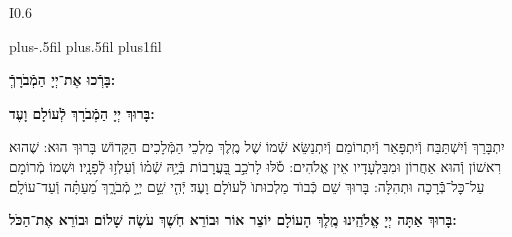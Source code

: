 \documentclass[twoside, openany, parskip=half, 11pt]{book}
\begin{document}
\newcommand{\barachu}{
\begin{wrapfigure}[5]{I}{0.6\textwidth}
\begin{minipage}{0.6\textwidth}
\leftskip=0pt plus-.5fil
\rightskip=0pt plus.5fil
\parfillskip=0pt plus1fil
\begin{large}

\shatz
\begin{Large}\textbf{בָּרְֿכוּ אֶת־יְיָ הַמְֿבֹרָךְֿ:}\end{Large}
\end{large}

\vspace{12pt}

\shatzvkahal
\textbf{בָּרוּךְ יְיָ הַמְֿבֹרָךְ לְֿעוֹלָם וָעֶד:}
\end{minipage}
\end{wrapfigure}

\begin{footnotesize}
יִתְבָּרַךְ וְֿיִשְׁתַּבַּח וְֿיִתְפָּאַר וְֿיִתְרוֹמַם וְֿיִתְנַשֵּׂא שְֿׁמוֹ שֶׁל מֶֽלֶךְ מַלְכֵי הַמְּֿלָכִים הַקָּדוֹשׁ בָּרוּךְ הוּא: שֶׁהוּא רִאשׁוֹן וְֿהוּא אַחֲרוֹן וּמִבַּלְעָדָיו אֵין אֱלֹהִים: \source{תהלים סח}סֹ֡לּוּ לָרֹכֵ֣ב בָּ֭עֲרָבוֹת בְּֿיָ֥הּ שְֿׁמ֗וֹ וְֿעִלְז֥וּ לְֿפָנָֽיו׃ וּשְׁמוֹ מְֿרוֹמָם עַל־כׇּל־בְּֿֿרָכָה וּתְהִלָּה: בָּרוּךְ שֵׁם כְּֿבוֺד מַלְכוּתוֺ לְֿעוֺלָם וָעֶד׃ \source{תהלים קיג}יְֿהִ֤י שֵׁ֣ם יְיָ֣ מְֿבֹרָ֑ךְ מֵ֝עַתָּ֗ה וְֿעַד־עוֹלָֽם׃

\end{footnotesize}
}


\barachu

\textbf{
בָּרוּךְ אַתָּה יְיָ אֱלֹהֵֽינוּ מֶֽלֶךְ הָעוֹלָם יוֹצֵר אוֹר וּבוֹרֵא חֹֽשֶׁךְ עֹשֶׂה שָׁלוֹם וּבוֹרֵא אֶת־הַכֹּל:
}

\newcommand{\hameir}{
\firstword{הַמֵּאִיר}
לָאָֽרֶץ וְֿלַדָּרִים עָלֶֽיהָ בְּֿרַחֲמִים וּבְטוּבוֹ מְֿחַדֵּשׁ בְּֿכׇל־יוֹם תָּמִיד מַעֲשֵׂה בְֿרֵאשִׁית: \source{תהלים קד}מָה־רַבּ֬וּ מַעֲשֶׂ֨יךָ ׀ יְיָ֗ כֻּ֭לָּם בְּֿחׇכְמָ֣ה עָשִׂ֑יתָ מָלְֿאָ֥ה הָ֝אָ֗רֶץ קִנְיָנֶֽךָ׃ הַמֶּֽלֶךְ הַמְֿרוֹמָם לְֿבַדּוֹ מֵאָז הַמְֿשֻׁבָּח וְֿהַמְֿפֹאָר וְֿהַמִּתְנַשֵּׂא מִימוֹת עוֹלָם: אֱלֹהֵי עוֹלָם בְּֿרַחֲמֶיךָ הָרַבִּים רַחֵם עָלֵינוּ אֲדוֹן עֻזֵּֽנוּ צוּר מִשְׂגַּבֵּנוּ מָגֵן יִשְׁעֵֽנוּ מִשְׂגָּב בַּעֲדֵֽנוּ: אֵ֗ל בָּ֗רוּךְ גְּֿ֗דוֹל דֵּ֗עָה הֵ֗כִין וּ֗פָעַל זׇׇׇׇׇׇׇׇׇׇָ֗הֳרֵי חַ֗מָּה ט֗וֹב יָ֗צַר כָּ֗בוֹד לִ֗שְׁמוֹ מְֿ֗אוֹרוֹת נָ֗תַן סְֿ֗בִיבוֹת עֻ֗זּוֹ פִּ֗נּוֹת צְֿ֗בָאָיו קְֿ֗דוֹשִׁים ר֗וֹמֲמֵי שַׁ֗דַּי תָּ֗מִיד מְֿסַפְּֿרִים כְּֿבוֹד־אֵל וּקְדֻשָׁתוֹ: תִּתְבָּרַךְ יְיָ אֱלֹהֵֽינוּ עַל־שֶׁבַח מַעֲשֵׂי יָדֶֽיךָ וְֿעַל־מְֿאֽוֹרֵי אוֹר שֶׁעָשִֽׂיתָ יְֿפָאֲרֽוּךָ סֶּֽלָה:
}

\newcommand{\kadoshkadoshkadosh}{•}
\end{document}
